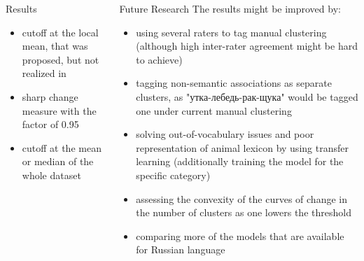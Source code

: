 \documentclass[xcolor=table]{beamer}
\newlength{\sepwidth}
\newcommand{\separatorcolumn}{\begin{column}{\sepwidth}\end{column}}
\begin{document}
\begin{frame}[t]
\begin{columns}[t]
\begin{column}{0.3\paperwidth}
\begin{block}{Results}
        \begin{itemize}
            \item cutoff at the local mean, that was proposed, but not realized in \cite{kim2019}
            \item sharp change  measure with the factor of 0.95
            \item cutoff at the mean or median of the whole dataset
        \end{itemize}
        \end{block}
    \end{column}
    \begin{column}{0.55\paperwidth}
        \begin{block}{Future Research}
        The results might be improved by:
        \begin{itemize}
            \item using several raters to tag manual clustering (although high inter-rater agreement might be hard to achieve)
            \item tagging non-semantic associations as separate clusters, as "утка-лебедь-рак-щука" would be tagged one under current manual clustering
            \item solving out-of-vocabulary issues and poor representation of animal lexicon by using transfer learning (additionally training the model for the specific category) 
            \item assessing the convexity of the curves of change in the number of clusters as one lowers the threshold
            \item comparing more of the models that are available for Russian language
        \end{itemize}
        \end{block}
    \end{column}
\end{columns}
\begin{columns}
    \separatorcolumn
    \begin{column}{0.9\paperwidth}
    \end{column}
    \separatorcolumn
\end{columns}

\end{frame}
\end{document}
